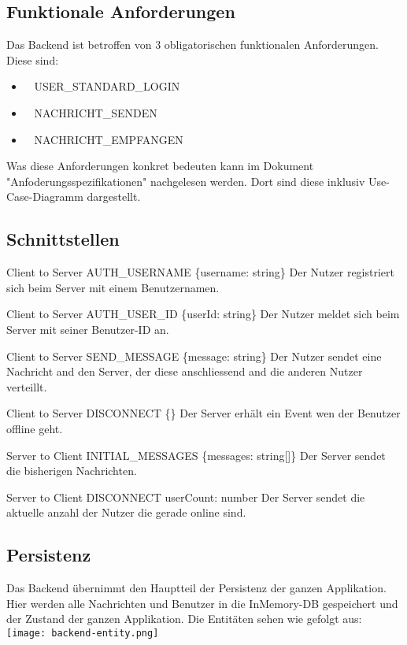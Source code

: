 	\newpage

	\subsection{Funktionale Anforderungen}
	Das Backend ist betroffen von 3 obligatorischen funktionalen Anforderungen. Diese sind:
	\begin{itemize}
		\item \faLock~ USER\_STANDARD\_LOGIN
		\item \faSend~ NACHRICHT\_SENDEN
		\item \faEnvelope~ NACHRICHT\_EMPFANGEN
	\end{itemize}
	Was diese Anforderungen konkret bedeuten kann im Dokument "Anfoderungsspezifikationen" nachgelesen werden. Dort sind diese inklusiv Use-Case-Diagramm dargestellt.

	\subsection{Schnittstellen}

	\apiSpecToblerone
	{Client to Server}
	{AUTH\_USERNAME}
	{\{username: string\}}
	{Der Nutzer registriert sich beim Server mit einem Benutzernamen.}

	\apiSpecToblerone
	{Client to Server}
	{AUTH\_USER\_ID}
	{\{userId: string\}}
	{Der Nutzer meldet sich beim Server mit seiner Benutzer-ID an.}

	\apiSpecToblerone
	{Client to Server}
	{SEND\_MESSAGE}
	{\{message: string\}}
	{Der Nutzer sendet eine Nachricht and den Server, der diese anschliessend and die anderen Nutzer verteillt.}

	\apiSpecToblerone
	{Client to Server}
	{DISCONNECT}
	{\{\}}
	{Der Server erhält ein Event wen der Benutzer offline geht.}

	\apiSpecToblerone
	{Server to Client}
	{INITIAL\_MESSAGES}
	{\{messages: string[]\}}
	{Der Server sendet die bisherigen Nachrichten.}

	\apiSpecToblerone
	{Server to Client}
	{DISCONNECT}
	{userCount: number}
	{Der Server sendet die aktuelle anzahl der Nutzer die gerade online sind.}

	\subsection{Persistenz}
	Das Backend übernimmt den Hauptteil der Persistenz der ganzen Applikation. Hier werden alle Nachrichten und Benutzer in die InMemory-DB gespeichert und der Zustand der ganzen Applikation.
	Die Entitäten sehen wie gefolgt aus:\newline
	\noindent
	\texttt{[image: backend-entity.png]}

